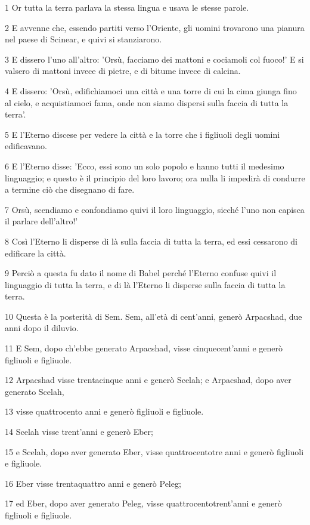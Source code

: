 \par 1 Or tutta la terra parlava la stessa lingua e usava le stesse parole.
\par 2 E avvenne che, essendo partiti verso l'Oriente, gli uomini trovarono una pianura nel paese di Scinear, e quivi si stanziarono.
\par 3 E dissero l'uno all'altro: 'Orsù, facciamo dei mattoni e cociamoli col fuoco!' E si valsero di mattoni invece di pietre, e di bitume invece di calcina.
\par 4 E dissero: 'Orsù, edifichiamoci una città e una torre di cui la cima giunga fino al cielo, e acquistiamoci fama, onde non siamo dispersi sulla faccia di tutta la terra'.
\par 5 E l'Eterno discese per vedere la città e la torre che i figliuoli degli uomini edificavano.
\par 6 E l'Eterno disse: 'Ecco, essi sono un solo popolo e hanno tutti il medesimo linguaggio; e questo è il principio del loro lavoro; ora nulla li impedirà di condurre a termine ciò che disegnano di fare.
\par 7 Orsù, scendiamo e confondiamo quivi il loro linguaggio, sicché l'uno non capisca il parlare dell'altro!'
\par 8 Così l'Eterno li disperse di là sulla faccia di tutta la terra, ed essi cessarono di edificare la città.
\par 9 Perciò a questa fu dato il nome di Babel perché l'Eterno confuse quivi il linguaggio di tutta la terra, e di là l'Eterno li disperse sulla faccia di tutta la terra.
\par 10 Questa è la posterità di Sem. Sem, all'età di cent'anni, generò Arpacshad, due anni dopo il diluvio.
\par 11 E Sem, dopo ch'ebbe generato Arpacshad, visse cinquecent'anni e generò figliuoli e figliuole.
\par 12 Arpacshad visse trentacinque anni e generò Scelah; e Arpacshad, dopo aver generato Scelah,
\par 13 visse quattrocento anni e generò figliuoli e figliuole.
\par 14 Scelah visse trent'anni e generò Eber;
\par 15 e Scelah, dopo aver generato Eber, visse quattrocentotre anni e generò figliuoli e figliuole.
\par 16 Eber visse trentaquattro anni e generò Peleg;
\par 17 ed Eber, dopo aver generato Peleg, visse quattrocentotrent'anni e generò figliuoli e figliuole.

